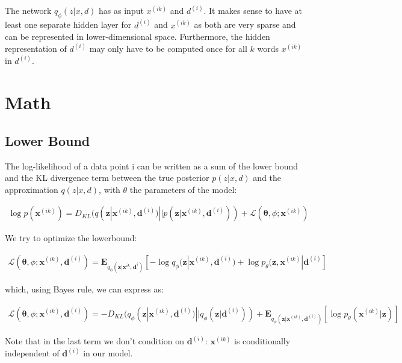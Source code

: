 \documentclass{article}
\begin{document}
The network $q_\phi(z|x,d)$ has as input $x^{(ik)}$ and $d^{(i)}$. It makes sense to have at least one separate hidden layer for $d^{(i)}$ and $x^{(ik)}$ as both are very sparse and can be represented in lower-dimensional space. Furthermore, the hidden representation of $d^{(i)}$ may only have to be computed once for all $k$ words $x^{(ik)}$ in $d^{(i)}$.

\section{Math}

\subsection{Lower Bound}

The log-likelihood of a data point i can be written as a sum of the lower bound and the KL divergence term between the true posterior $p(z|x,d)$ and the approximation $q(z|x,d)$, with $\theta$ the parameters of the model:

\begin{align*}
    \log p(\mathbf{x}^{(ik)}) = D_{KL}(q(\mathbf{z}|\mathbf{x}^{(ik)},\mathbf{d}^{(i)}) || p(\mathbf{z}|\mathbf{x}^{(ik)},\mathbf{d}^{(i)})) + \mathcal{L}(\mathbf{\theta}, \phi; \mathbf{x}^{(ik)})
\end{align*}

We try to optimize the lowerbound: 

\begin{align}
\mathcal{L}(\mathbf{\theta}, \phi; \mathbf{x}^{(ik)}, \mathbf{d}^{(i)}) = \mathbf{E}_{q_\phi(\mathbf{z}|\mathbf{x}^{ik},\mathbf{d}^{i})}[-\log q_\phi (\mathbf{z}| \mathbf{x}^{(ik)}, \mathbf{d}^{(i)})+\log p_\theta(\mathbf{z}, \mathbf{x}^{(ik)}|\mathbf{d}^{(i)} ]
\end{align}

which, using Bayes rule, we can express as:

\begin{align}
\mathcal{L}(\mathbf{\theta}, \phi; \mathbf{x}^{(ik)}, \mathbf{d}^{(i)}) = -D_{KL}(q_\phi (\mathbf{z}| \mathbf{x}^{(ik)}, \mathbf{d}^{(i)})||q_\phi (\mathbf{z}| \mathbf{d}^{(i)})) + \mathbf{E}_{q_\phi(\mathbf{z}|\mathbf{x}^{(ik)},\mathbf{d}^{(i)})}[\log p_\theta (\mathbf{x}^{(ik)}|\mathbf{z})]
\end{align}

Note that in the last term we don't condition on $\mathbf{d}^{(i)}$: $\mathbf{x}^{(ik)}$ is conditionally independent of $\mathbf{d}^{(i)}$ in our model.
\end{document}
